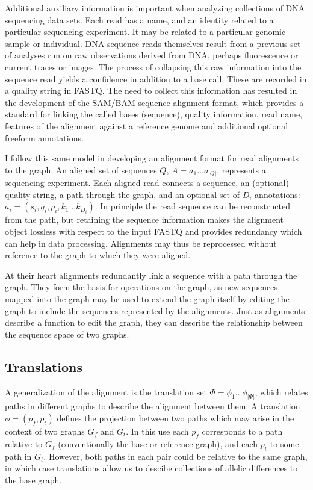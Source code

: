 Additional auxiliary information is important when analyzing collections of DNA sequencing data sets.
Each read has a name, and an identity related to a particular sequencing experiment.
It may be related to a particular genomic sample or individual.
DNA sequence reads themselves result from a previous set of analyses run on raw observations derived from DNA, perhaps fluorescence or current traces or images.
The process of collapsing this raw information into the sequence read yields a confidence in addition to a base call.
These are recorded in a quality string in FASTQ.
The need to collect this information has resulted in the development of the SAM/BAM sequence alignment format, which provides a standard for linking the called bases (sequence), quality information, read name, features of the alignment against a reference genome and additional optional freeform annotations.

I follow this same model in developing an alignment format for read alignments to the graph.
An aligned set of sequences $Q$, $A = a_1 \ldots a_{|Q|}$, represents a sequencing experiment.
Each aligned read connects a sequence, an (optional) quality string, a path through the graph, and an optional set of $D_i$ annotations: $a_i = (s_i, q_i, p_i, k_1\ldots k_{D_i})$.
In principle the read sequence can be reconstructed from the path, but retaining the sequence information makes the alignment object lossless with respect to the input FASTQ and provides redundancy which can help in data processing.
Alignments may thus be reprocessed without reference to the graph to which they were aligned.

At their heart alignments redundantly link a sequence with a path through the graph.
They form the basis for operations on the graph, as new sequences mapped into the graph may be used to extend the graph itself by editing the graph to include the sequences represented by the alignments.
Just as alignments describe a function to edit the graph, they can describe the relationship between the sequence space of two graphs.

\subsection{Translations}
\label{sec:translation}

A generalization of the alignment is the translation set $\Phi = \phi_1 \ldots \phi_{|\Phi|}$, which relates paths in different graphs to describe the alignment between them.
A translation $\phi = (p_f, p_t)$ defines the projection between two paths which may arise in the context of two graphs $G_f$ and $G_t$.
In this use each $p_f$ corresponds to a path relative to $G_f$ (conventionally the base or reference graph), and each $p_t$ to some path in $G_t$.
However, both paths in each pair could be relative to the same graph, in which case translations allow us to descibe collections of allelic differences to the base graph.

